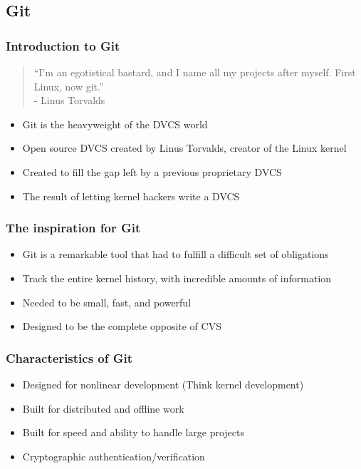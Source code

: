 \documentclass{beamer}
\begin{document}
\subsection{Git}

\begin{frame}
    \frametitle{Introduction to Git}
    \begin{quotation}
    ``I'm an egotistical bastard, and I name all my projects after myself. First Linux, now git.'' \\
    - Linus Torvalds
  \end{quotation}
    \begin{itemize}
	\item Git is the heavyweight of the DVCS world
	\item Open source DVCS created by Linus Torvalds, creator of the Linux kernel
	\item Created to fill the gap left by a previous proprietary DVCS
	\item The result of letting kernel hackers write a DVCS
    \end{itemize}
\end{frame}

\begin{frame}
    \frametitle{The inspiration for Git}
    \begin{itemize}
	\item Git is a remarkable tool that had to fulfill a difficult set of obligations
	\item Track the entire kernel history, with incredible amounts of information
	\item Needed to be small, fast, and powerful
	\item Designed to be the complete opposite of CVS
    \end{itemize}
\end{frame}

\begin{frame}
    \frametitle{Characteristics of Git}
    \begin{itemize}
	\item Designed for nonlinear development (Think kernel development)
	\item Built for distributed and offline work
	\item Built for speed and ability to handle large projects
	\item Cryptographic authentication/verification
    \end{itemize}
\end{frame}
\end{document}
